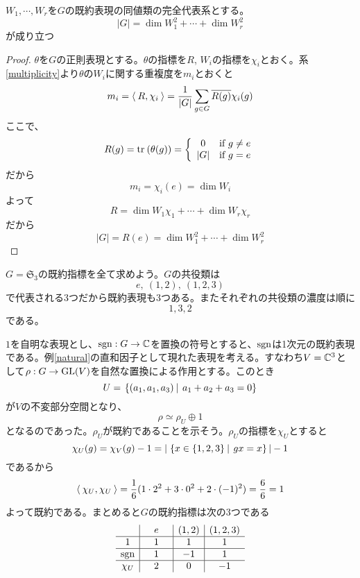 \documentclass{ltjsreport}
\begin{document}
\begin{prop}\label{dim_formula}
  $W_1,\cdots,W_r$を$G$の既約表現の同値類の完全代表系とする。
  \[
  |G|=\dim W_1^2+\cdots +\dim W_r^2  
  \]
  が成り立つ
\end{prop}

\begin{proof}
  $\theta$を$G$の正則表現とする。$\theta$の指標を$R$, $W_i$の指標を$\chi_i$とおく。系\ref{multiplicity}より$\theta$の$W_i$に関する重複度を$m_i$とおくと
  \[
  m_i=\langle\:R,\chi_i\:\rangle=\frac{1}{|G|}\sum_{g\in G}\overline{R(g)}\chi_i(g)
  \]
  ここで、
  \[
  R(g)=\text{tr}\:(\theta(g))=\left\{\begin{array}{cl}
    0 & \text{if $g\neq e$}\\
    |G| & \text{if $g=e$}
  \end{array}\right.  
  \]
  だから
  \[
  m_i=\chi_i(e)=\dim W_i  
  \]
  よって
  \[
  R=\dim W_1\chi_1+\cdots +\dim W_r\chi_r  
  \]
  だから
  \[
  |G|=R(e)=\dim W_1^2+\cdots +\dim W_r^2  
  \]
\end{proof}

\begin{eg}\label{S3}
  $G=\mathfrak{S}_3$の既約指標を全て求めよう。$G$の共役類は
  \[
  e,\:(1,2),\:(1,2,3)  
  \]
  で代表される3つだから既約表現も3つある。またそれぞれの共役類の濃度は順に
  \[
  1,3,2  
  \]
  である。

  $1$を自明な表現とし、$\mathrm{sgn}:G\rightarrow \mathbb{C}$を置換の符号とすると、$\mathrm{sgn}$は1次元の既約表現である。例\ref{natural}の直和因子として現れた表現を考える。すなわち$V=\mathbb{C}^3$として$\rho:G\rightarrow\mathrm{GL}(V)$を自然な置換による作用とする。このとき
  \[
  U=\left.\left\{(a_1,a_1,a_3) \: \right| \: a_1+a_2+a_3=0\right\}  
  \]
  が$V$の不変部分空間となり、
  \[
  \rho\simeq\rho_U\oplus 1  
  \]
  となるのであった。$\rho_U$が既約であることを示そう。$\rho_U$の指標を$\chi_U$とすると
  \[
  \chi_U(g)=\chi_V(g)-1=|\left.\left\{x\in\{1,2,3\} \: \right| \: gx=x\right\}|-1  
  \]
  であるから
  \[
  \langle\:\chi_U,\chi_U\:\rangle=\frac{1}{6}(1\cdot 2^2+3\cdot 0^2+2\cdot (-1)^2)=\frac{6}{6}=1 
  \]
  よって既約である。まとめると$G$の既約指標は次の3つである
  \[
  \begin{array}{c|c|c|c}
        &\quad e\quad & (1,2) & (1,2,3) \\ \hline
    1   &      1      &   1   &    1    \\ \hline
  \mathrm{sgn}  &      1      &   -1  &    1    \\ \hline
  \chi_U&      2      &   0   &    -1
  \end{array}
  \]
\end{eg}
\end{document}
